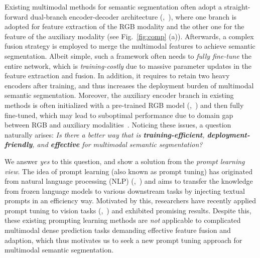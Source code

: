 \documentclass[10pt,twocolumn,letterpaper]{article}
\begin{document}
Existing multimodal methods for semantic segmentation often adopt a straight-forward dual-branch encoder-decoder architecture (\eg,~\cite{EGFNetTits,EGFNet,GMNet, MTANet,fuseseg,CMX}), where one branch is adopted for feature extraction of the RGB modality and the other one for the feature of the auxiliary modality (see Fig.~\ref{fig:comp} (a)). Afterwards, a complex fusion strategy is employed to merge the multimodal features to achieve semantic segmentation. Albeit simple, such a framework often needs to \emph{fully fine-tune} the entire network, which is \emph{training-costly} due to massive parameter updates in the feature extraction and fusion. In addition, it requires to retain two heavy encoders after training, and thus increases the deployment burden of multimodal semantic segmentation. Moreover, the auxiliary encoder branch in existing methods is often initialized with a pre-trained RGB model (\eg,~\cite{ResNet, convnext, segformer}) and then fully fine-tuned, which may lead to suboptimal performance due to domain gap between RGB and auxiliary modalities~\cite{abmdrnet}. Noticing these issues, a question naturally arises: \emph{Is there a better way that is \textbf{training-efficient}, \textbf{deployment-friendly}, and \textbf{effective} for multimodal semantic segmentation?} 

We answer \emph{yes} to this question, and show a solution from the \emph{prompt learning view}. The idea of prompt learning (also known as prompt tuning) has originated from natural language processing (NLP) (\eg,~\cite{li2021prefix,powerprompt}) and aims to transfer the knowledge from frozen language models to various downstream tasks by injecting textual prompts in an efficiency way. Motivated by this, researchers have recently applied prompt tuning to vision tasks (\eg,~\cite{VPT, vipt, adaptformer, e2vpt, promptsegmentation, CoOp, CoCoOp}) and exhibited promising results. Despite this, these existing prompting learning methods are \emph{not} applicable to complicated multimodal dense prediction tasks demanding effective feature fusion and adaption, which thus motivates us to seek a new prompt tuning approach for multimodal semantic segmentation.
\end{document}
